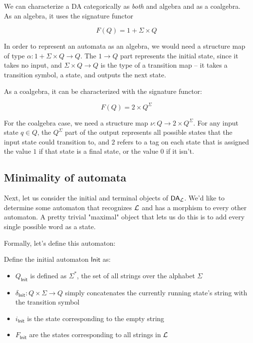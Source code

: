 \begin{remark}
  We can characterize a DA categorically as \emph{both} and algebra and as a coalgebra.
  As an algebra, it uses the signature functor
  
    \begin{equation}
    F(Q) = 1 + \Sigma \times Q
    \end{equation}

  In order to represent an automata as an algebra, we would need a structure map of type $\alpha : 1 + \Sigma \times Q \rightarrow Q$.
  The $1 \rightarrow Q$ part represents the initial state, since it takes no input, and $\Sigma \times Q \rightarrow Q$ is the type of a transition map -- it takes a transition symbol, a state, and outputs the next state.
  
  As a coalgebra, it can be characterized with the signature functor:
  
  \begin{equation}
    F(Q) = 2 \times Q^\Sigma
  \end{equation}
  
  For the coalgebra case, we need a structure map $\nu : Q \rightarrow 2 \times Q^\Sigma$.
  For any input state $q \in Q$, the $Q^\Sigma$ part of the output represents all possible states that the input state could transition to, and $2$ refers to a tag on each state that is assigned the value $1$ if that state is a final state, or the value $0$ if it isn't.
\end{remark}

\subsection{Minimality of automata}

Next, let us consider the initial and terminal objects of $\mathsf{DA}_\mathcal L$.
We'd like to determine some automaton that recognizes $\mathcal L$ and has a morphism to every other automaton.
A pretty trivial "maximal" object that lets us do this is to add every single possible word as a state.

Formally, let's define this automaton:

\newcommand{\Init}{\mathsf{Init}}
\begin{definition}
 Define the initial automaton $\Init$ as: 
 \begin{itemize}
    \item $Q_\Init$ is defined as $\Sigma^*$, the set of all strings over the alphabet $\Sigma$
    \item $\delta_\Init : Q \times \Sigma \rightarrow Q$ simply concatenates the currently running state's string with the transition symbol
    \item $i_\Init$ is the state corresponding to the empty string
    \item $F_\Init$ are the states corresponding to all strings in $\mathcal L$
 \end{itemize}
\end{definition}

